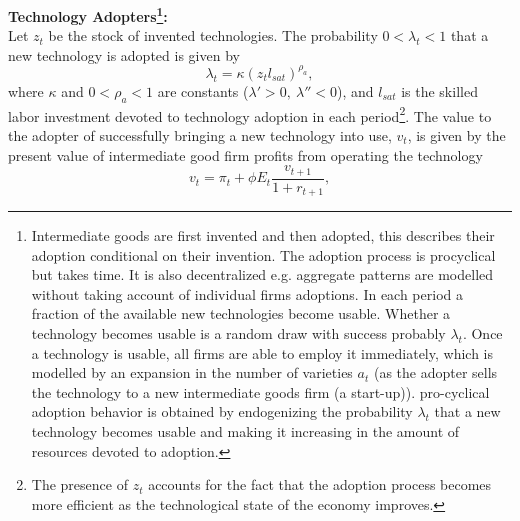 \documentclass[compress,xcolor=dvipsnames]{beamer}
\begin{document}
\begin{frame}
\textbf{Technology Adopters\footnote{\tiny Intermediate goods are first invented and then adopted, this describes their adoption conditional on their invention. The adoption process is procyclical but takes time. It is also decentralized e.g. aggregate patterns are modelled without taking account of individual firms adoptions. In each period a fraction of the available new technologies become usable. Whether a technology becomes usable is a random draw with success probably $\lambda_t$. Once a technology is usable, all firms are able to employ it immediately, which is modelled by an expansion in the number of varieties $a_t$ (as the adopter sells the technology to a new intermediate goods firm (a start-up)). pro-cyclical adoption behavior is obtained by endogenizing the probability $\lambda_t$ that a new technology becomes usable and making it increasing in the amount of resources devoted to adoption.}:} \\

Let $z_t$ be the stock of invented technologies. The probability $0<\lambda_t<1$ that a new technology is adopted is given by
\begin{equation} 
\lambda_t = \kappa (z_tl_{sat})^{\rho_a},
\end{equation}
where $\kappa$ and $0<\rho_a<1$ are constants ($\lambda'>0,\  \lambda''<0$), and $l_{sat}$ is the skilled labor investment devoted to technology adoption in each period\footnote{\tiny The presence of $z_t$ accounts for the fact that the adoption process becomes more efficient as the technological state of the economy improves.}. The value to the adopter of successfully bringing a new technology into use, $v_t$, is given by the present value of intermediate good firm profits from operating the technology
\begin{equation} \label{eq:VAT}
v_t = \pi_t+\phi E_t \frac{v_{t+1}}{1+r_{t+1}},
\end{equation}
\end{frame}
\end{document}
